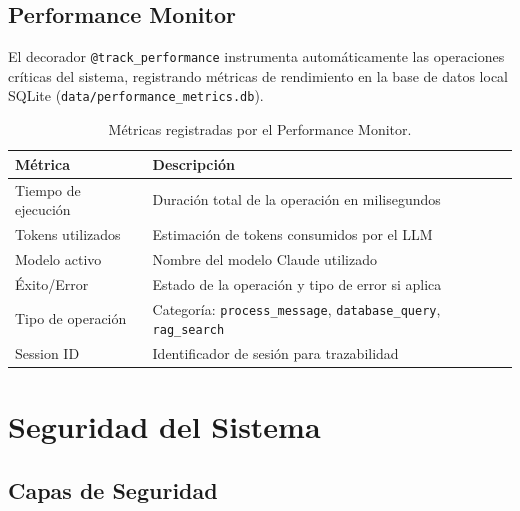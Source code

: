 ﻿\documentclass[11pt,a4paper]{article}
\begin{document}
\subsection{Performance Monitor}

El decorador \texttt{@track\_performance} instrumenta autom\'aticamente las operaciones cr\'iticas del sistema, registrando m\'etricas de rendimiento en la base de datos local SQLite (\texttt{data/performance\_metrics.db}).

\begin{table}[H]
\centering
\caption{M\'etricas registradas por el Performance Monitor.}
\label{tab:perfmetrics}
\begin{tabularx}{\textwidth}{lX}
\toprule
\textbf{M\'etrica} & \textbf{Descripci\'on} \\
\midrule
Tiempo de ejecuci\'on & Duraci\'on total de la operaci\'on en milisegundos \\
Tokens utilizados & Estimaci\'on de tokens consumidos por el LLM \\
Modelo activo & Nombre del modelo Claude utilizado \\
\'Exito/Error & Estado de la operaci\'on y tipo de error si aplica \\
Tipo de operaci\'on & Categor\'ia: \texttt{process\_message}, \texttt{database\_query}, \texttt{rag\_search} \\
Session ID & Identificador de sesi\'on para trazabilidad \\
\bottomrule
\end{tabularx}
\end{table}

\section{Seguridad del Sistema}

\subsection{Capas de Seguridad}
\end{document}
